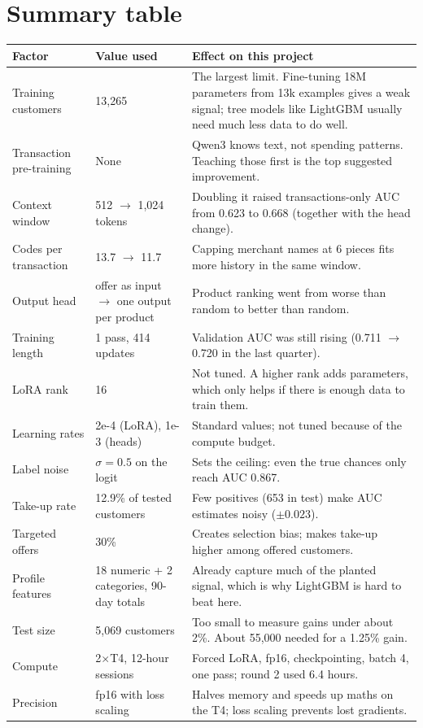 \documentclass[10pt,a4paper]{article}
\begin{document}
\section{Summary table}
\begin{tabularx}{\linewidth}{@{}L{3.2cm}L{3.3cm}X@{}}
\toprule
\textbf{Factor} & \textbf{Value used} & \textbf{Effect on this project} \\
\midrule
Training customers & 13,265 & The largest limit. Fine-tuning 18M parameters from 13k examples gives a weak signal; tree models like LightGBM usually need much less data to do well. \\
Transaction pre-training & None & Qwen3 knows text, not spending patterns. Teaching those first is the top suggested improvement. \\
Context window & 512 $\to$ 1,024 tokens & Doubling it raised transactions-only AUC from 0.623 to 0.668 (together with the head change). \\
Codes per transaction & 13.7 $\to$ 11.7 & Capping merchant names at 6 pieces fits more history in the same window. \\
Output head & offer as input $\to$ one output per product & Product ranking went from worse than random to better than random. \\
Training length & 1 pass, 414 updates & Validation AUC was still rising (0.711 $\to$ 0.720 in the last quarter). \\
LoRA rank & 16 & Not tuned. A higher rank adds parameters, which only helps if there is enough data to train them. \\
Learning rates & 2e-4 (LoRA), 1e-3 (heads) & Standard values; not tuned because of the compute budget. \\
Label noise & $\sigma=0.5$ on the logit & Sets the ceiling: even the true chances only reach AUC 0.867. \\
Take-up rate & 12.9\% of tested customers & Few positives (653 in test) make AUC estimates noisy ($\pm0.023$). \\
Targeted offers & 30\% & Creates selection bias; makes take-up higher among offered customers. \\
Profile features & 18 numeric + 2 categories, 90-day totals & Already capture much of the planted signal, which is why LightGBM is hard to beat here. \\
Test size & 5,069 customers & Too small to measure gains under about 2\%. About 55,000 needed for a 1.25\% gain. \\
Compute & 2$\times$T4, 12-hour sessions & Forced LoRA, fp16, checkpointing, batch 4, one pass; round 2 used 6.4 hours. \\
Precision & fp16 with loss scaling & Halves memory and speeds up maths on the T4; loss scaling prevents lost gradients. \\
\bottomrule
\end{tabularx}
\end{document}
